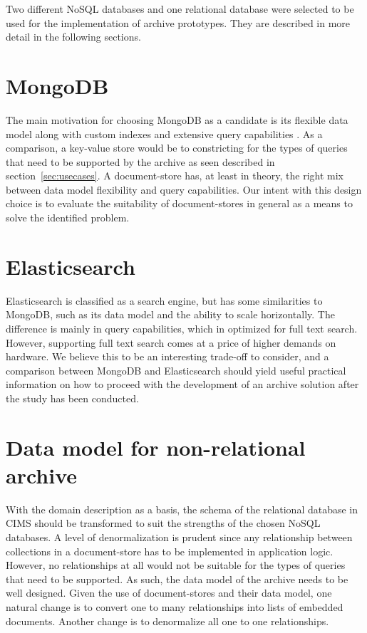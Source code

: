 Two different NoSQL databases and one relational database were selected to be used for the implementation of archive prototypes. They are described in more detail in the following sections.

\section{MongoDB}
The main motivation for choosing MongoDB as a candidate is its flexible data model along with custom indexes and extensive query capabilities \cite{Catell}. As a comparison, a key-value store would be to constricting for the types of queries that need to be supported by the archive as seen described in section~\ref{sec:usecases}. A document-store has, at least in theory, the right mix between data model flexibility and query capabilities. Our intent with this design choice is to evaluate the suitability of document-stores in general as a means to solve the identified problem. 

\section{Elasticsearch}
Elasticsearch is classified as a search engine, but has some similarities to MongoDB, such as its data model and the ability to scale horizontally. The difference is mainly in query capabilities, which in optimized for full text search. However, supporting full text search comes at a price of higher demands on hardware. We believe this to be an interesting trade-off to consider, and a comparison between MongoDB and Elasticsearch should yield useful practical information on how to proceed with the development of an archive solution after the study has been conducted.

\section{Data model for non-relational archive} \label{nosqlmodel}
With the domain description as a basis, the schema of the relational database in CIMS should be transformed to suit the strengths of the chosen NoSQL databases. A level of denormalization is prudent since any relationship between collections in a document-store has to be implemented in application logic. However, no relationships at all would not be suitable for the types of queries that need to be supported. As such, the data model of the archive needs to be well designed. Given the use of document-stores and their data model, one natural change is to convert one to many relationships into lists of embedded documents. Another change is to denormalize all one to one relationships.

